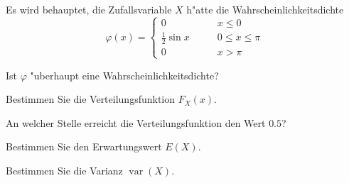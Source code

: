 Es wird behauptet, die Zufallsvariable $X$ h"atte die Wahrscheinlichkeitsdichte
\[
\varphi(x)=\begin{cases}
0&\qquad x\le 0\\
\frac12\sin x&\qquad 0\le x\le \pi\\
0&\qquad x > \pi
\end{cases}
\]
\begin{teilaufgaben}
\item Ist $\varphi$ "uberhaupt eine Wahrscheinlichkeitsdichte?
\item Bestimmen Sie die Verteilungsfunktion $F_X(x)$.
\item An welcher Stelle erreicht die Verteilungsfunktion den Wert $0.5$?
\item Bestimmen Sie den Erwartungswert $E(X)$.
\item Bestimmen Sie die Varianz $\operatorname{var}(X)$.
\end{teilaufgaben}

